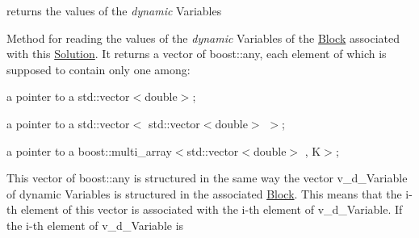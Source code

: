 returns the values of the {\itshape dynamic} Variables 

Method for reading the values of the {\itshape dynamic} Variables of the \mbox{\hyperlink{class_s_m_spp__di__unipi__it_1_1_block}{Block}} associated with this \mbox{\hyperlink{class_s_m_spp__di__unipi__it_1_1_solution}{Solution}}. It returns a vector of boost\+::any, each element of which is supposed to contain only one among\+:


\begin{DoxyItemize}
\item a pointer to a std\+::vector$<$double$>$;
\item a pointer to a std\+::vector$<$ std\+::vector$<$double$>$ $>$;
\item a pointer to a boost\+::multi\+\_\+array$<$std\+::vector$<$double$>$ , K$>$;
\end{DoxyItemize}

This vector of boost\+::any is structured in the same way the vector v\+\_\+d\+\_\+\+Variable of dynamic Variables is structured in the associated \mbox{\hyperlink{class_s_m_spp__di__unipi__it_1_1_block}{Block}}. This means that the i-\/th element of this vector is associated with the i-\/th element of v\+\_\+d\+\_\+\+Variable. If the i-\/th element of v\+\_\+d\+\_\+\+Variable is


